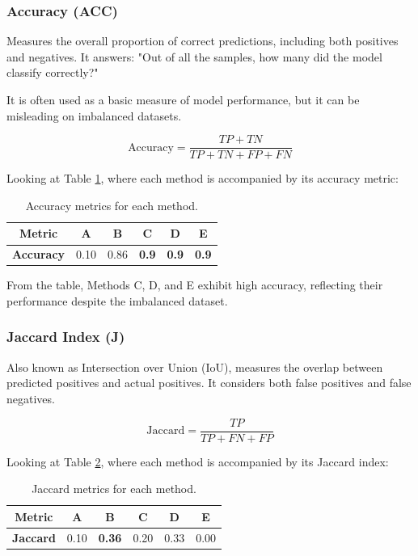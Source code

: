 \documentclass{llncs}
\begin{document}
\subsubsection{Accuracy (ACC)}
Measures the overall proportion of correct predictions, including both positives and negatives. It answers: "Out of all the samples, how many did the model classify correctly?"

It is often used as a basic measure of model performance, but it can be misleading on imbalanced datasets.

\[
\text{Accuracy} = \frac{TP + TN}{TP + TN + FP + FN}
\]

Looking at Table \ref{tab:accuracy}, where each method is accompanied by its accuracy metric:
\begin{table}[h]
	\centering
	\begin{tabular}{|c|c|c|c|c|c|} 
		\hline 
		\textbf{Metric} & \textbf{A} & \textbf{B} & \textbf{C} & \textbf{D} & \textbf{E} \\ 
		\hline 
		\textbf{Accuracy} & 0.10 & 0.86 & \textbf{0.9} & \textbf{0.9} & \textbf{0.9} \\ 
		\hline 
	\end{tabular} 
	\caption{Accuracy metrics for each method.} 
	\label{tab:accuracy} 
\end{table}

\vspace{-20pt}

From the table, Methods C, D, and E exhibit high accuracy, reflecting their performance despite the imbalanced dataset.

\subsubsection{Jaccard Index (J)}
Also known as Intersection over Union (IoU), measures the overlap between predicted positives and actual positives. It considers both false positives and false negatives.

\[
\text{Jaccard} = \frac{TP}{TP + FN + FP}
\]

Looking at Table \ref{tab:jaccard}, where each method is accompanied by its Jaccard index:
\begin{table}[h]
	\centering
	\begin{tabular}{|c|c|c|c|c|c|} 
		\hline 
		\textbf{Metric} & \textbf{A} & \textbf{B} & \textbf{C} & \textbf{D} & \textbf{E} \\ 
		\hline 
		\textbf{Jaccard} & 0.10 & \textbf{0.36} & 0.20 & 0.33 & 0.00 \\ 
		\hline 
	\end{tabular} 
	\caption{Jaccard metrics for each method.} 
	\label{tab:jaccard} 
\end{table}
\end{document}
